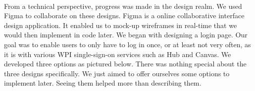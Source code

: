 \paragraph{}
From a technical perspective, progress was made in the design realm. We used Figma to collaborate on these designs. Figma is a online collaborative interface design application. It enabled us to mock-up wireframes in real-time that we would then implement in code later. We began with designing a login page. Our goal was to enable users to only have to log in once, or at least not very often, as it is with various WPI single-sign-on services such as Hub and Canvas. We developed three options as pictured below. There was nothing special about the three designs specifically. We just aimed to offer ourselves some options to implement later. Seeing them helped more than describing them.


